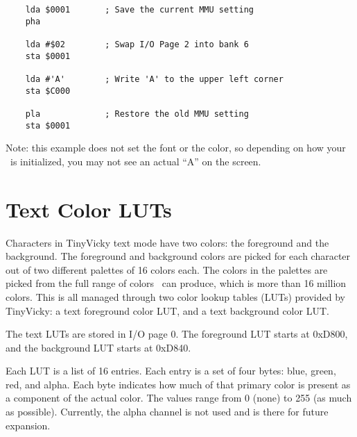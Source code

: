 \begin{verbatim}
    lda $0001       ; Save the current MMU setting
    pha

    lda #$02        ; Swap I/O Page 2 into bank 6
    sta $0001

    lda #'A'        ; Write 'A' to the upper left corner
    sta $C000

    pla             ; Restore the old MMU setting
    sta $0001
\end{verbatim}

Note: this example does not set the font or the color, so depending on how your \jr\ is initialized, you may not see an actual ``A'' on the screen.

\section*{Text Color LUTs}

Characters in TinyVicky text mode have two colors: the foreground and the background. The foreground and background colors are picked for each character out of two different palettes of 16 colors each. The colors in the palettes are picked from the full range of colors \jr\ can produce, which is more than 16 million colors. This is all managed through two color lookup tables (LUTs) provided by TinyVicky: a text foreground color LUT, and a text background color LUT.

The text LUTs are stored in I/O page 0. The foreground LUT starts at 0xD800, and the background LUT starts at 0xD840.

Each LUT is a list of 16 entries. Each entry is a set of four bytes: blue, green, red, and alpha. Each byte indicates how much of that primary color is present as a component of the actual color. The values range from 0 (none) to 255 (as much as possible). Currently, the alpha channel is not used and is there for future expansion.

